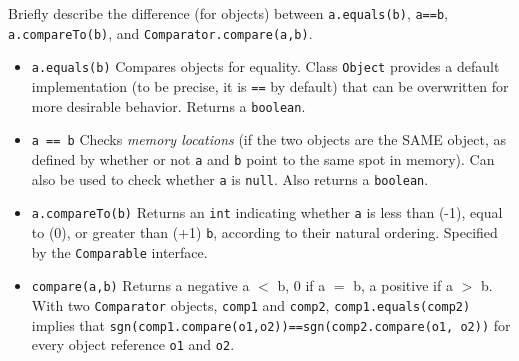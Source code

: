 Briefly describe the difference (for objects) between \texttt{a.equals(b)}, \texttt{a==b}, \texttt{a.compareTo(b)}, and \texttt{Comparator.compare(a,b)}.

\begin{answer}
\begin{itemize}

\item \texttt{a.equals(b)} Compares objects for equality. Class \texttt{Object} provides a default implementation (to be precise, it is \texttt{==} by default) that can be overwritten for more desirable behavior. Returns a \texttt{boolean}.

\item \texttt{a == b}  Checks \textit{memory locations} (if the two objects are the SAME object, as defined by whether or not \texttt{a} and \texttt{b} point to the same spot in memory). Can also be used to check whether \texttt{a} is \texttt{null}. Also returns a \texttt{boolean}.

\item \texttt{a.compareTo(b)} Returns an \texttt{int} indicating whether \texttt{a} is less than (-1),
equal to (0), or greater than (+1) \texttt{b}, according to their natural ordering. Specified by the \texttt{Comparable} interface.

\item \texttt{compare(a,b)} Returns a negative a $<$ b, 0 if a $=$ b, a positive if a $>$ b. \\
With two \texttt{Comparator} objects, \texttt{comp1} and \texttt{comp2},
\texttt{comp1.equals(comp2)} implies that \texttt{sgn(comp1.compare(o1,o2))==sgn(comp2.compare(o1, o2))} for every object reference \texttt{o1} and \texttt{o2}.

\end{itemize}
\end{answer}
